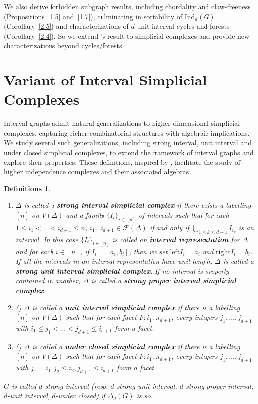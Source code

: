 \documentclass[12pt,reqno]{amsart}
\theoremstyle{plain}
\newtheorem{definitions}[theorem]{Definitions}
\theoremstyle{definition}
\numberwithin{equation}{section}
\begin{document}
We also derive forbidden subgraph results, including chordality and claw-freeness (Propositions~\ref{1.5} and~\ref{1.7}), culminating in sortability of $\mathrm{Ind}_d(G)$ (Corollary~\ref{2.5}) and characterizations of $d$-unit interval cycles and forests (Corollary~\ref{2.4}). So we extend \cite{C+R}'s result to simplicial complexes and provide new characterizations beyond cycles/forests.

\section{Variant of Interval Simplicial Complexes}
Interval graphs admit natural generalizations to higher-dimensional simplicial complexes, capturing richer combinatorial structures with algebraic implications. We study several such generalizations, including strong interval, unit interval and under closed simplicial complexes, to extend the framework of interval graphs and explore their properties. These definitions, inspired by \cite{B+S+V}, facilitate the study of higher independence complexes and their associated algebras.

\begin{definitions}\label{1.1}
\begin{enumerate}
\item $\Delta$ is called a \textbf{strong interval simplicial complex} if there exists a labelling $[n]$ on $V(\Delta)$ and a family $\{I_i\}_{i\in [n]}$ of intervals such that for each $1\leq i_1<\dots <i_{d+1} \leq n$,  $i_1 \dots  i_{d+1}\in \mathcal{F}(\Delta )$ if and only if $\bigcup _{1\leq k \leq d+1}I_{i_k}$ is an interval. In this case $\{I_i\}_{i\in [n]}$ is called an \textbf{interval representation} for $\Delta$ and for each $i\in [n]$, if $I_i=[a_i, b_i]$, then we set $\mathrm{left}I_i=a_i$ and $\mathrm{right}I_i=b_i$. 
    If all the intervals in an interval representation have unit length, $\Delta$ is called a \textbf{strong unit interval simplicial complex}. If no interval is properly contained in another, $\Delta$ is called a \textbf{strong proper interval simplicial complex}.

\item (\cite[Definition 30]{B+S+V}) $\Delta$ is called a \textbf{unit interval simplicial complex} if there is a labelling $[n]$ on $V(\Delta)$ such that for each facet $F: i_1\dots i_{d+1}$, every integers $j_1, \dots, j_{d+1}$ with $i_1\leq j_1<\dots <j_{d+1}\leq i_{d+1}$ form a facet.
    
\item (\cite[Definition 31]{B+S+V}) $\Delta$ is called a \textbf{under closed simplicial complex} if there is a labelling $[n]$ on $V(\Delta)$ such that for each facet $F: i_1\dots i_{d+1}$, every integers $j_1, \dots, j_{d+1}$ with $j_1=i_1, j_2\leq i_2, j_{d+1}\leq i_{d+1}$ form a facet. 
\end{enumerate}
$G$ is called $d$-strong interval (resp. $d$-strong unit interval, $d$-strong proper interval,  $d$-unit interval, $d$-under closed) if $\Delta_d(G)$ is so.
\end{definitions}
\end{document}
